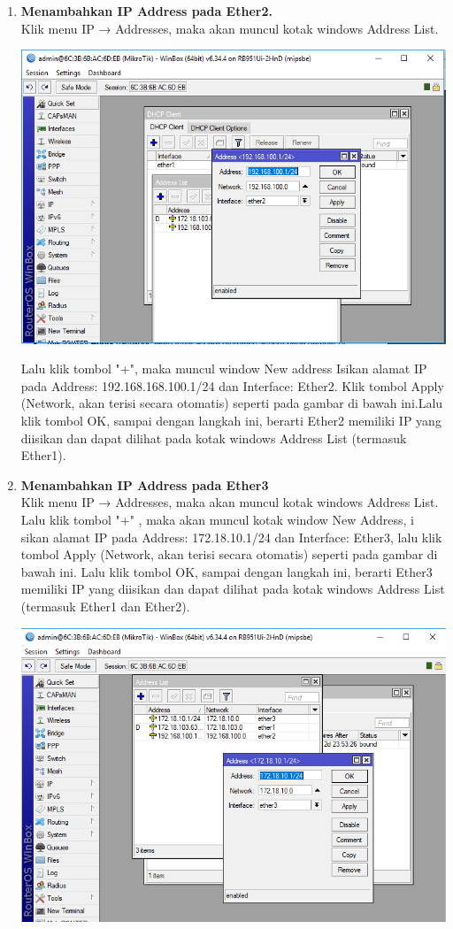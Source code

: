 \documentclass[a4paper,12pt]{article}
\begin{document}
\begin{enumerate}
	\item \textbf{Menambahkan IP Address pada Ether2.\\}
	Klik menu IP → Addresses, maka akan muncul kotak windows Address List.
	\begin{center}
		\includegraphics[scale=.5]{Capture6}
	\end{center}
	Lalu klik tombol "+", maka muncul window New address Isikan alamat IP pada Address: 192.168.168.100.1/24 dan Interface: Ether2. Klik tombol Apply (Network, akan terisi secara otomatis) seperti pada gambar di
	bawah ini.Lalu klik tombol OK, sampai dengan langkah ini, berarti Ether2 memiliki IP yang diisikan dan dapat dilihat pada kotak windows Address List (termasuk Ether1).
	
	\item \textbf{Menambahkan IP Address pada Ether3\\}
	Klik menu IP → Addresses, maka akan muncul kotak windows Address List. Lalu klik tombol "+"
	, maka akan muncul kotak window New Address,
	i sikan alamat IP pada Address: 172.18.10.1/24 dan Interface: Ether3, lalu klik
	tombol Apply (Network, akan terisi secara otomatis) seperti pada gambar di
	bawah ini. Lalu klik tombol OK, sampai dengan langkah ini, berarti Ether3 memiliki IP yang
	diisikan dan dapat dilihat pada kotak windows Address List (termasuk Ether1 dan
	Ether2).
	\begin{center}
		\includegraphics[scale=.5]{Capture7}
	\end{center}
	

\end{enumerate}
\end{document}
